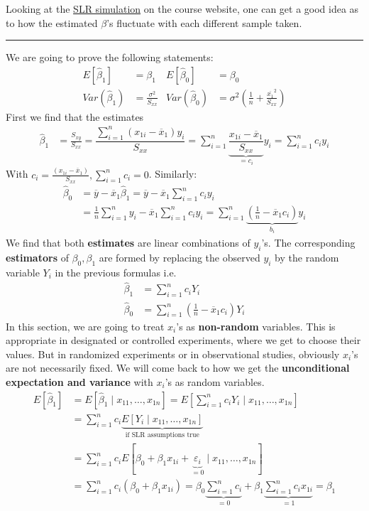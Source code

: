 \documentclass[12 pt]{article}
\begin{document}
Looking at the \href{https://yangyi.shinyapps.io/simulation/}{SLR
  simulation} on the course website, one can get a good idea as to how
the estimated $\beta$'s fluctuate with each different sample taken.
\\ \noindent \rule{\textwidth}{0.5pt}
We are going to prove the following statements:
\begin{align*}
  E[\hat{\beta}_1] & = \beta_1 & E[\hat{\beta}_0] & = \beta_0
  \\ Var(\hat{\beta}_1) & = \frac{\sigma^2}{S_{xx}} & Var(\hat{\beta}_0) & = \sigma^2 \left(\frac{1}{n} + \frac{\overline{x_1}^2}{S_{xx}}\right)
\end{align*}
First we find that the estimates
\begin{align*}
  \hat{\beta}_1 & = \frac{S_{xy}}{S_{xx}} = \dfrac{\sum_{i=1}^n (x_{1i} - \overline{x}_1)y_i}{S_{xx}} = \sum_{i=1}^n \underbrace{\dfrac{x_{1i} - \overline{x}_1}{S_{xx}}}_{= c_i}y_{i}
  = \sum_{i=1}^n c_i y_i
\end{align*}
With $c_i = \frac{(x_{1i} - \overline{x}_1)}{S_{xx}}, \sum_{i=1}^n c_i
= 0$. Similarly:
\begin{align*}
  \hat{\beta}_0 & = \overline{y} - \overline{x}_1 \hat{\beta}_1 = \overline{y} - \overline{x}_1 \sum_{i=1}^n c_i y_i
  \\ & = \frac{1}{n} \sum_{i=1}^n y_i - \overline{x}_1 \sum_{i=1}^nc_iy_i = \sum_{i=1}^{n} \underbrace{\left(\frac{1}{n} - \overline{x}_1 c_i\right)}_{b_i} y_i
\end{align*}
We find that both \textbf{estimates} are linear combinations of
$y_i$'s. The corresponding \textbf{estimators} of $\beta_0, \beta_1$
are formed by replacing the observed $y_i$ by the random variable
$Y_i$ in the previous formulas i.e.\
\begin{align*}
  \hat{\beta}_1 & = \sum_{i=1}^n c_i Y_i
  \\ \hat{\beta}_0 & = \sum_{i=1}^n \left(\frac{1}{n} - \overline{x}_1 c_i\right) Y_i
\end{align*}
In this section, we are going to treat $x_i$'s as \textbf{non-random}
variables. This is appropriate in designated or controlled
experiments, where we get to choose their values. But in randomized
experiments or in observational studies, obviously $x_i$'s are not
necessarily fixed. We will come back to how we get the
\textbf{unconditional expectation and variance} with $x_i$'s as random
variables.
\begin{align*}
  E[\hat{\beta}_1] & = E[\hat{\beta}_1 \mid x_{11}, \ldots, x_{1n}]
                     = E \left[\sum_{i=1}^n c_i Y_i \mid x_{11},\ldots, x_{1n}\right]
  \\ & = \sum_{i=1}^n c_i \underbrace{E \left[Y_i \mid x_{11}, \ldots,
       x_{1n}\right]}_{\text{if SLR assumptions true}}
  \\ & = \sum_{i=1}^n c_i E \left[\beta_0 + \beta_1 x_{1i} + \underbrace{\varepsilon_i}_{=0} \mid x_{11}, \ldots, x_{1n}\right]
  \\ & = \sum_{i=1}^n c_i (\beta_0 + \beta_1 x_{1i}) = \beta_0 \underbrace{\sum_{i = 1}^{n}c_i}_{= 0} + \beta_1 \underbrace{\sum_{i=1}^nc_i x_{1i}}_{=1} = \beta_1
\end{align*}
\end{document}
